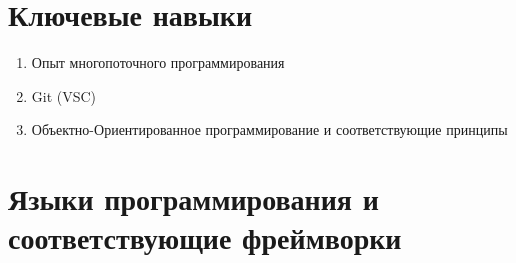 \documentclass[]{report}
\newcommand\VRule{\color{lightgray}\vrule width 0.5pt}
\begin{document}

\section*{Ключевые навыки}

\begin{enumerate}

\item {{\large Опыт многопоточного программирования}}
\item {{\large Git (VSC)}}
\item {{\large Объектно-Ориентированное программирование и соответствующие принципы}}

\end{enumerate}

\section*{Языки программирования и соответствующие фреймворки}
\end{document}
